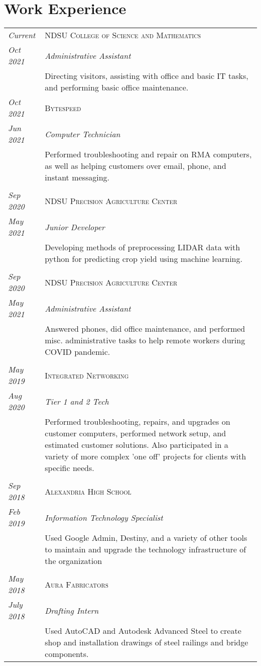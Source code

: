 \documentclass[letterpaper,10pt]{article}
\begin{document}
\section*{Work Experience}
	\begin{tabular}{R{2cm}|p{14cm}}
	\textsl{Current}	&\textsc{NDSU College of Science and Mathematics}\\
	\textsl{Oct 2021}	&\emph{Administrative Assistant}\\
	& Directing visitors, assisting with office and basic IT tasks, and performing basic office maintenance.\\
	\textsl{Oct 2021}	& \textsc{Bytespeed}\\
	\textsl{Jun 2021}	& \emph{Computer Technician}\\
	& Performed troubleshooting and repair on RMA computers, as well as helping customers over email, phone, and instant messaging.\\
	\\
	\textsl{Sep 2020}	& \textsc{NDSU Precision Agriculture Center}\\
	\textsl{May 2021}	& \emph{Junior Developer}\\
	& Developing methods of preprocessing LIDAR data with python for predicting crop yield using machine learning.\\
	\\
	\textsl{Sep 2020}	& \textsc{NDSU Precision Agriculture Center}\\
	\textsl{May 2021}	& \emph{Administrative Assistant}\\
	& Answered phones, did office maintenance, and performed misc. administrative tasks to help remote workers during COVID pandemic.\\
	\\
	\textsl{May 2019}	& \textsc{Integrated Networking}\\
	\textsl{Aug 2020}	& \emph{Tier 1 and 2 Tech}\\
	& Performed troubleshooting, repairs, and upgrades on customer computers, performed network setup, and estimated customer solutions.
	Also participated in a variety of more complex 'one off' projects for clients with specific needs.\\
	\\
	\textsl{Sep 2018}	& \textsc{Alexandria High School}\\
	\textsl{Feb 2019}	& \emph{Information Technology Specialist}\\
	& Used Google Admin, Destiny, and a variety of other tools to maintain and upgrade the technology infrastructure of the organization\\
	\\
	\textsl{May 2018}   & \textsc{Aura Fabricators}\\
	\textsl{July 2018}  & \emph{Drafting Intern}\\
	&Used AutoCAD and Autodesk Advanced Steel to create shop and installation drawings of steel railings and bridge components.\\
	\end{tabular}
\end{document}

